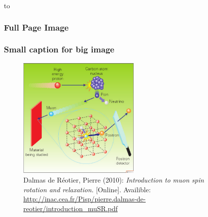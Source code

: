 {
	{
		\vbox to 
	}
	\begin{frame}[plain]
		\frametitle{Full Page Image}
	\end{frame}
}





\begin{frame}[fragile]
	\frametitle{Small caption for big image}
	\begin{figure}[!htb]
		\begin{center}
			\includegraphics[height=6cm, keepaspectratio]{figures/musr_general_principle.png}%
			\caption*{  \setlength{\baselineskip}{6pt}
				{\tiny 
					Dalmas de Réotier, Pierre (2010): \textit{ 						
						Introduction to muon spin rotation and relaxation.
					}
					[Online]. Availible: \url{
						http://inac.cea.fr/Pisp/pierre.dalmas-de-reotier/introduction_muSR.pdf
					}
				}
			}%
		\end{center}
	\end{figure}          
\end{frame}























